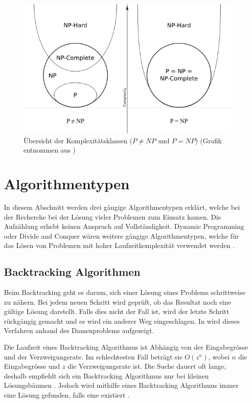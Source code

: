 \begin{figure}[h]
\includegraphics[scale=0.65]{images/einleitung/p_np_np-complete_np-hard.png}
\caption[Übersicht der Komplexitätsklassen ($P!=NP$ und $P=NP$)]{Übersicht der Komplexitätsklassen ($P \neq NP$ und $P=NP$) (Grafik entnommen aus \cite{pic_p_np})}
\label{fig:complexity_overview}
\end{figure}

\section{Algorithmentypen}\label{algo_types}
In diesem Abschnitt werden drei gängige Algorithmentypen erklärt, welche bei der Recherche bei der Lösung vieler Problemen zum 
Einsatz kamen. Die Aufzählung erhebt keinen Anspruch auf Vollständigkeit. Dynamic Programming oder Divide and Conquer wären 
weitere gängige Algorithmentypen, welche für das Lösen von Problemen mit hoher Laufzeitkomplexität verwendet werden \cite{vazirani_algorithm}.

\subsection{Backtracking Algorithmen}\label{backtracking_algos}
Beim Backtracking geht es darum, sich einer Lösung eines Problems schrittweise zu nähern. Bei jedem neuen Schritt wird geprüft, ob das Resultat noch eine gültige Lösung darstellt. Falls dies 
nicht der Fall ist, wird der letzte Schritt rückgängig gemacht und es wird ein anderer Weg eingeschlagen. In \cite{backtracking} wird dieses Verfahren anhand des Damenproblems aufgezeigt.

Die Laufzeit eines Backtracking Algorithmus ist Abhängig von der Eingabegrösse und der Verzweigungsrate. Im schlechtesten Fall beträgt sie
$O(z^n)$, wobei $n$ die Eingabegrösse und $z$ die Verzweigungsrate ist. Die Suche dauert oft lange, deshalb empfiehlt sich ein Backtracking 
Algorithmus nur bei kleinen Lösungsbäumen \cite{stephens2013essential}. Jedoch wird mithilfe eines Backtracking Algorithmus immer eine Lösung gefunden, falls 
eine existiert \cite{pomberger2008algorithmen}.

